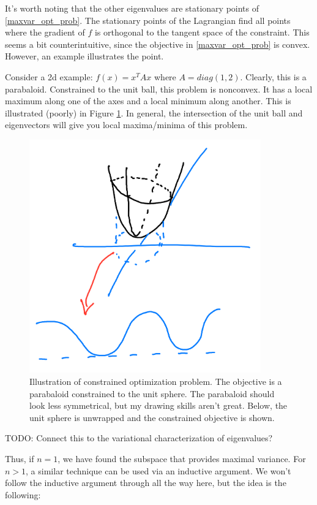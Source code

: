\documentclass{book}
\begin{document}
It's worth noting that the other eigenvalues are stationary points of \eqref{maxvar_opt_prob}. The stationary points of the Lagrangian find all points where the gradient of $f$ is orthogonal to the tangent space of the constraint. This seems a bit counterintuitive, since the objective in \eqref{maxvar_opt_prob} is convex. However, an example illustrates the point. 

Consider a 2d example: $f(x) = x^T A x$ where $A = diag(1, 2)$. Clearly, this is a parabaloid. Constrained to the unit ball, this problem is nonconvex. It has a local maximum along one of the axes and a local minimum along another. This is illustrated (poorly) in Figure \ref{fig:constrained-eig-opt}. In general, the intersection of the unit ball and eigenvectors will give you local maxima/minima of this problem. 

\begin{figure}[h] \label{fig:constrained-eig-opt}
\centering
\includegraphics[width=10cm]{images/Constrained-opt-eig.png}
\caption{Illustration of constrained optimization problem. The objective is a parabaloid constrained to the unit sphere. The parabaloid should look less symmetrical, but my drawing skills aren't great. Below, the unit sphere is unwrapped and the constrained objective is shown.}
\end{figure}

TODO: Connect this to the variational characterization of eigenvalues? 

Thus, if $n = 1$, we have found the subspace that provides maximal variance. For $n>1$, a similar technique can be used via an inductive argument. We won't follow the inductive argument through all the way here, but the idea is the following:
\end{document}
